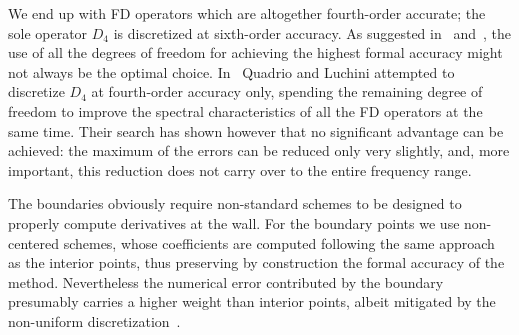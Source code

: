 We end up with FD operators which are altogether fourth-order accurate; the sole operator $D_{4}$ is discretized at sixth-order accuracy. As suggested in~\cite{kim_moin_moser} and~\cite{compact:difference}, the use of all the degrees of freedom for achieving the highest formal accuracy might not always be the optimal choice. In~\cite{cpl:presentazione} Quadrio and Luchini attempted to discretize $D_{4}$ at fourth-order accuracy only, spending the remaining degree of freedom to improve the spectral characteristics of all the FD operators at the same time. Their search has shown however that no significant advantage can be achieved: the maximum of the errors can be reduced only very slightly, and, more important, this reduction does not carry over to the entire frequency range.\par
The boundaries obviously require non-standard schemes to be designed to properly compute derivatives at the wall. For the boundary points we use non-centered schemes, whose coefficients are computed following the same approach as the interior points, thus preserving by construction the formal accuracy of the method. Nevertheless the numerical error contributed by the boundary presumably carries a higher weight than interior points, albeit mitigated by the non-uniform discretization~\cite{cpl:presentazione}. 
